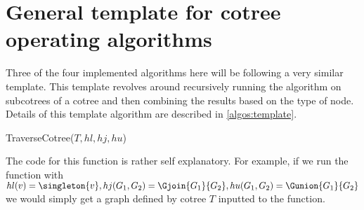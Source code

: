 
\section{General template for cotree operating algorithms}

Three of the four implemented algorithms here will be following a very similar template. This template revolves around recursively running the algorithm on subcotrees of a cotree and then combining the results based on the type of node. Details of this template algorithm are described in \ref{algos:template}.


\begin{function}
    \caption{TraverseCotree($T, hl, hj, hu$)}
    \label{algos:template}
    \DontPrintSemicolon

\end{function}

The code for this function is rather self explanatory. For example, if we run the function with $hl(v) = \singleton{v}, hj(G_1, G_2) = \Gjoin{G_1}{G_2}, hu(G_1, G_2) = \Gunion{G_1}{G_2}$ we would simply get a graph defined by cotree $T$ inputted to the function.
